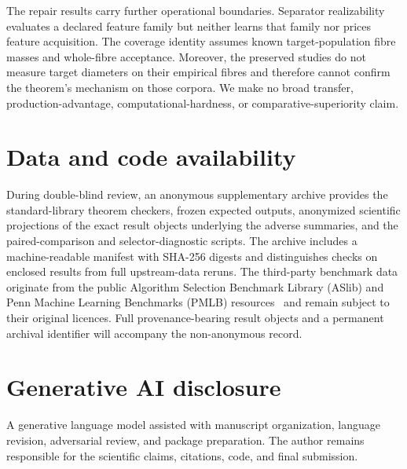 \documentclass[10pt]{article}
\newcommand{\1}{\mathbf{1}}
\begin{document}
The repair results carry further operational boundaries. Separator realizability evaluates a declared feature family but neither learns that family nor prices feature acquisition. The coverage identity assumes known target-population fibre masses and whole-fibre acceptance. Moreover, the preserved studies do not measure target diameters on their empirical fibres and therefore cannot confirm the theorem's mechanism on those corpora. We make no broad transfer, production-advantage, computational-hardness, or comparative-superiority claim.

\section{Data and code availability}
During double-blind review, an anonymous supplementary archive provides the standard-library theorem checkers, frozen expected outputs, anonymized scientific projections of the exact result objects underlying the adverse summaries, and the paired-comparison and selector-diagnostic scripts. The archive includes a machine-readable manifest with SHA-256 digests and distinguishes checks on enclosed results from full upstream-data reruns. The third-party benchmark data originate from the public Algorithm Selection Benchmark Library (ASlib) and Penn Machine Learning Benchmarks (PMLB) resources~\citep{bischl2016,olson2017} and remain subject to their original licences. Full provenance-bearing result objects and a permanent archival identifier will accompany the non-anonymous record.

\section{Generative AI disclosure}
A generative language model assisted with manuscript organization, language revision, adversarial review, and package preparation. The author remains responsible for the scientific claims, citations, code, and final submission.

\begingroup
\small
\setlength{\bibsep}{2pt}


\endgroup
\end{document}
